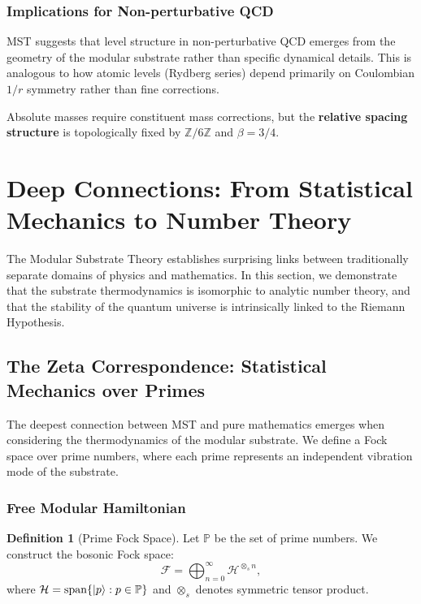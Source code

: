 \documentclass[11pt, a4paper]{article}
\theoremstyle{plain}
\theoremstyle{definition}
\newtheorem{definition}[theorem]{Definition}
\newcommand{\Zmod}{\mathbb{Z}/6\mathbb{Z}}
\begin{document}
\subsubsection{Implications for Non-perturbative QCD}

MST suggests that level structure in non-perturbative QCD emerges from the geometry of the modular substrate rather than specific dynamical details. This is analogous to how atomic levels (Rydberg series) depend primarily on Coulombian $1/r$ symmetry rather than fine corrections.

Absolute masses require constituent mass corrections, but the \textbf{relative spacing structure} is topologically fixed by $\Zmod$ and $\beta = 3/4$.


\section{Deep Connections: From Statistical Mechanics to Number Theory}
\label{sec:connections}

The Modular Substrate Theory establishes surprising links between traditionally separate domains of physics and mathematics. In this section, we demonstrate that the substrate thermodynamics is isomorphic to analytic number theory, and that the stability of the quantum universe is intrinsically linked to the Riemann Hypothesis.

\subsection{The Zeta Correspondence: Statistical Mechanics over Primes}

The deepest connection between MST and pure mathematics emerges when considering the thermodynamics of the modular substrate. We define a Fock space over prime numbers, where each prime represents an independent vibration mode of the substrate.

\subsubsection{Free Modular Hamiltonian}

\begin{definition}[Prime Fock Space]
Let $\mathbb{P}$ be the set of prime numbers. We construct the bosonic Fock space:
\begin{equation}
\mathcal{F} = \bigoplus_{n=0}^\infty \mathcal{H}^{\otimes_s n},
\end{equation}
where $\mathcal{H} = \text{span}\{\ket{p} : p \in \mathbb{P}\}$ and $\otimes_s$ denotes symmetric tensor product.
\end{definition}
\end{document}
